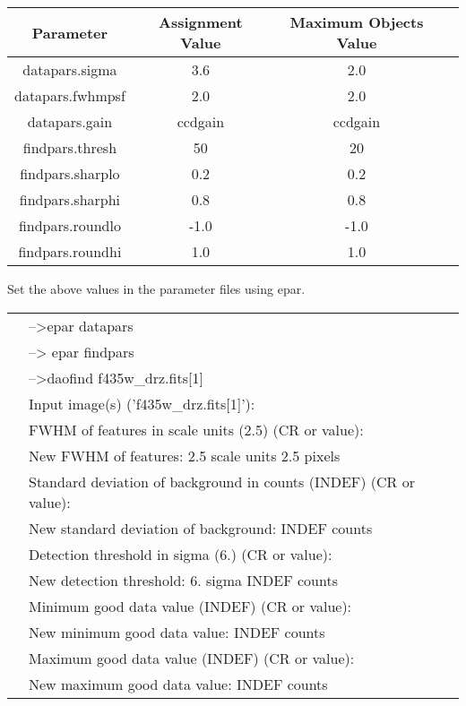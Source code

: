 \begin{table}[tbh]
 \begin{center}
 \begin{tabular}{|c|c|c|c|}
 \hline
 Parameter & Assignment Value & Maximum Objects Value \\
 \hline \hline
 datapars.sigma & 3.6 & 2.0\\
 \hline
 datapars.fwhmpsf & 2.0 & 2.0\\
 \hline
 datapars.gain & ccdgain  & ccdgain\\
 \hline
 findpars.thresh & 50 & 20\\
 \hline
 findpars.sharplo & 0.2 & 0.2\\
 \hline
 findpars.sharphi & 0.8 & 0.8\\
 \hline
 findpars.roundlo & -1.0 & -1.0\\
 \hline
 findpars.roundhi & 1.0 & 1.0\\
 \hline
 
 \end{tabular}
 \end{center}
\end{table}

Set the above values in the parameter files using epar.
\begin{table}
\begin{tabular}{ll}
& {\color{RoyalBlue}-->epar datapars } \\
& {\color{RoyalBlue}--> epar findpars } \\
& {\color{RoyalBlue}-->daofind   f435w\_drz.fits[1] } \\

& {\color{Green} Input image(s) ('f435w\_drz.fits[1]')}:  \\ 

& {\color{Green}FWHM of features in scale units (2.5) (CR or value): } \\
&  {\color{Green}	New FWHM of features: 2.5 scale units  2.5 pixels } \\
& {\color{Green}Standard deviation of background in counts (INDEF) (CR or value):  }  \\
&  {\color{Green}	New standard deviation of background: INDEF counts } \\
& {\color{Green}Detection threshold in sigma (6.) (CR or value):  } \\
&  {\color{Green}	New detection threshold: 6. sigma INDEF counts  } \\
& {\color{Green}Minimum good data value (INDEF) (CR or value):  } \\
&  {\color{Green}	New minimum good data value: INDEF counts }  \\
& {\color{Green}Maximum good data value (INDEF) (CR or value):  }  \\
&  {\color{Green}	New maximum good data value: INDEF counts } \\
\end{tabular}
\end{table}


